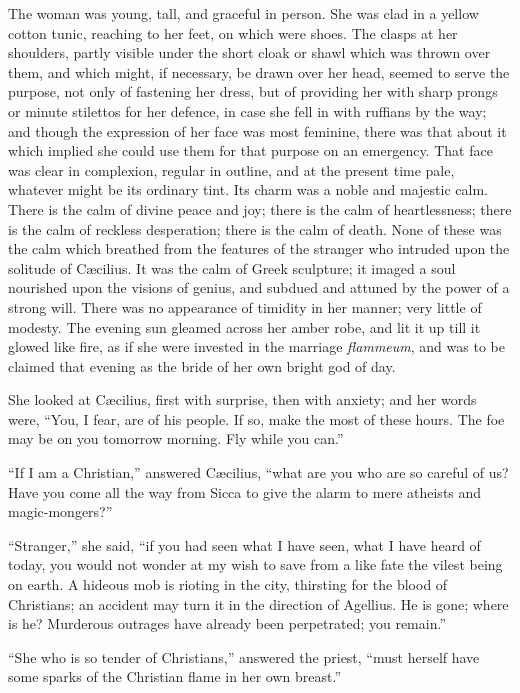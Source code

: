 The woman was young, tall, and graceful in person. She was clad in
a yellow cotton tunic, reaching to her feet, on which were shoes. The
clasps at her shoulders, partly visible under the short cloak or shawl
which was thrown over them, and which might, if necessary, be drawn
over her head, seemed to serve the purpose, not only of fastening her
dress, but of providing her with sharp prongs or minute stilettos for
her defence, in case she fell in with ruffians by the way; and though
the expression of her face was most feminine, there was that about it
which implied she could use them for that purpose on an emergency.
That face was clear in complexion, regular in outline, and at
the present time pale, whatever might be its ordinary tint. Its charm
was a noble and majestic calm. There is the calm of divine peace and
joy; there is the calm of heartlessness; there is the calm of reckless
desperation; there is the calm of death. None of these was the calm
which breathed from the features of the stranger who intruded upon the
solitude of Cæcilius. It was the calm of Greek sculpture; it imaged a
soul nourished upon the visions of genius, and subdued and attuned by
the power of a strong will. There was no appearance of timidity in her
manner; very little of modesty. The evening sun gleamed across her
amber robe, and lit it up till it glowed like fire, as if she were
invested in the marriage \emph{flammeum}, and was to be claimed that
evening as the bride of her own bright god of day.

She looked at Cæcilius, first with surprise, then with anxiety;
and her words were, ``You, I fear, are of his people. If so, make
the most of these hours. The foe may be on you tomorrow morning. Fly
while you can.''

``If I am a Christian,'' answered Cæcilius, ``what are
you who are so careful of us? Have you come all the way from Sicca to
give the alarm to mere atheists and magic-mongers?''

``Stranger,'' she said, ``if you had seen what I have
seen, what I have heard of today, you would not wonder at my wish to
save from a like fate the vilest being on earth. A hideous mob is
rioting in the city, thirsting for the blood of Christians; an
accident may turn it in the direction of Agellius. He is gone; where
is he? Murderous outrages have already been perpetrated; you
remain.''

``She who is so tender of Christians,'' answered the
priest, ``must herself have some sparks of the Christian flame in
her own breast.''

